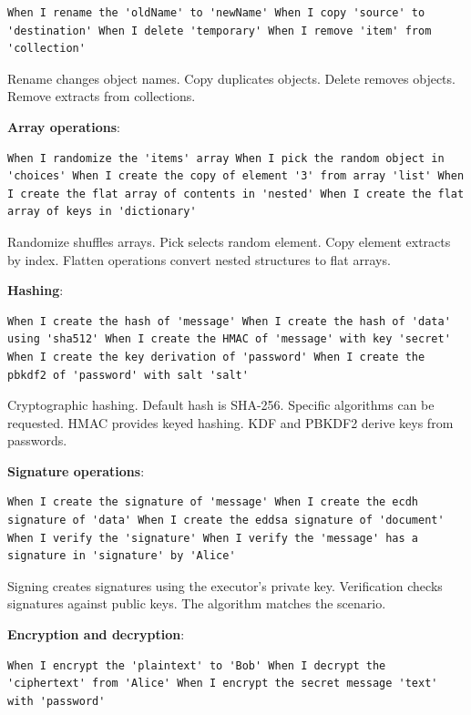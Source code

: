 \begin{verbatim}
When I rename the 'oldName' to 'newName' When I copy 'source' to
'destination' When I delete 'temporary' When I remove 'item' from
'collection'
\end{verbatim}

Rename changes object names. Copy duplicates objects. Delete removes
objects. Remove extracts from collections.

\textbf{Array operations}:

\begin{verbatim}
When I randomize the 'items' array When I pick the random object in
'choices' When I create the copy of element '3' from array 'list' When
I create the flat array of contents in 'nested' When I create the flat
array of keys in 'dictionary'
\end{verbatim}

Randomize shuffles arrays. Pick selects random element. Copy element
extracts by index. Flatten operations convert nested structures to
flat arrays.

\textbf{Hashing}:

\begin{verbatim}
When I create the hash of 'message' When I create the hash of 'data'
using 'sha512' When I create the HMAC of 'message' with key 'secret'
When I create the key derivation of 'password' When I create the
pbkdf2 of 'password' with salt 'salt'
\end{verbatim}

Cryptographic hashing. Default hash is SHA-256. Specific algorithms
can be requested. HMAC provides keyed hashing. KDF and PBKDF2 derive
keys from passwords.

\textbf{Signature operations}:

\begin{verbatim}
When I create the signature of 'message' When I create the ecdh
signature of 'data' When I create the eddsa signature of 'document'
When I verify the 'signature' When I verify the 'message' has a
signature in 'signature' by 'Alice'
\end{verbatim}

Signing creates signatures using the executor's private
key. Verification checks signatures against public keys. The algorithm
matches the scenario.

\textbf{Encryption and decryption}:

\begin{verbatim}
When I encrypt the 'plaintext' to 'Bob' When I decrypt the
'ciphertext' from 'Alice' When I encrypt the secret message 'text'
with 'password'
\end{verbatim}

